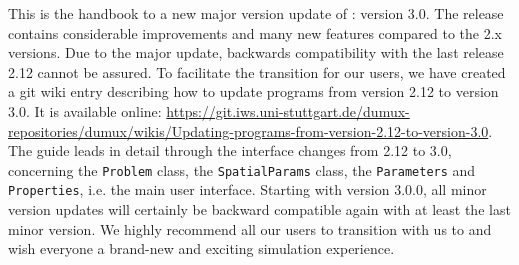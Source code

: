 This is the handbook to a new major version update of \Dumux: version 3.0.
The release contains considerable improvements and many new features compared to the 2.x versions. 
Due to the major update, backwards compatibility with the last release 2.12 cannot be assured.
To facilitate the transition for our users, we have created a
git wiki entry describing how to update programs from version 2.12 to version 3.0.
It is available online:
\url{https://git.iws.uni-stuttgart.de/dumux-repositories/dumux/wikis/Updating-programs-from-version-2.12-to-version-3.0}.
The guide leads in detail through the interface changes from 2.12 to 3.0,
concerning the \texttt{Problem} class, the \texttt{SpatialParams} class,
the \texttt{Parameters} and \texttt{Properties}, i.e. the main user interface.
Starting with version 3.0.0, all minor
version updates will certainly be backward compatible again with at least the last minor version.
We highly recommend all our users to transition with us to 
and wish everyone a brand-new and exciting simulation experience.
